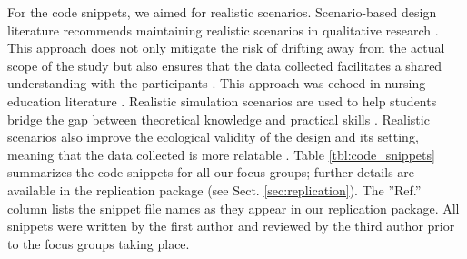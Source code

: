 For the code snippets, we aimed for realistic scenarios. Scenario-based design literature recommends maintaining realistic scenarios in qualitative research \citep{carroll2003making}. This approach does not only mitigate the risk of drifting away from the actual scope of the study but also ensures that the data collected facilitates a shared understanding with the participants \citep{carroll2003making}. This approach was echoed in nursing education literature \citep{jeffries2005framework,shin2015effectiveness,cant2010simulation}. Realistic simulation scenarios are used to help students bridge the gap between theoretical knowledge and practical skills \citep{jeffries2005framework,shin2015effectiveness,cant2010simulation}. Realistic scenarios also improve the ecological validity of the design and its setting, meaning that the data collected is more relatable \citep{gaba2004future}. Table \ref{tbl:code_snippets} summarizes the code snippets for all our focus groups; further details are available in the replication package (see Sect. \ref{sec:replication}). The ''Ref.'' column lists the snippet file names as they appear in our replication package. All snippets were written by the first author and reviewed by the third author prior to the focus groups taking place.


